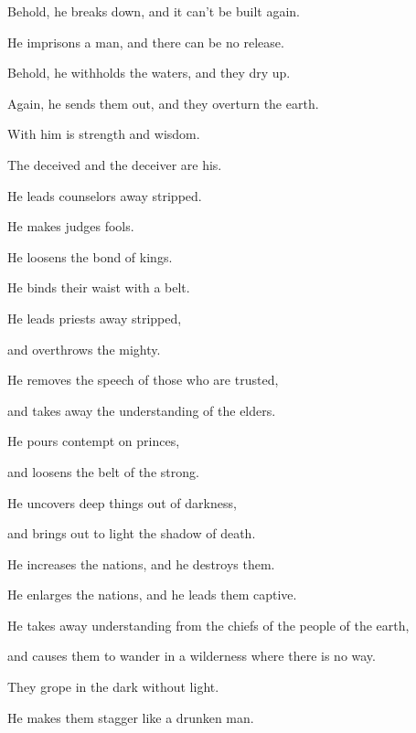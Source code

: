 {\par }{\Q {}Behold, he breaks down, and it can’t be built again.
\par }{\QB He imprisons a man, and there can be no release.
\par }{\Q {}Behold, he withholds the waters, and they dry up.
\par }{\QB Again, he sends them out, and they overturn the earth.
\par }{\Q {}With him is strength and wisdom.
\par }{\QB The deceived and the deceiver are his.
\par }{\Q {}He leads counselors away stripped.
\par }{\QB He makes judges fools.
\par }{\Q {}He loosens the bond of kings.
\par }{\QB He binds their waist with a belt.
\par }{\Q {}He leads priests away stripped,
\par }{\QB and overthrows the mighty.
\par }{\Q {}He removes the speech of those who are trusted,
\par }{\QB and takes away the understanding of the elders.
\par }{\Q {}He pours contempt on princes,
\par }{\QB and loosens the belt of the strong.
\par }{\Q {}He uncovers deep things out of darkness,
\par }{\QB and brings out to light the shadow of death.
\par }{\Q {}He increases the nations, and he destroys them.
\par }{\QB He enlarges the nations, and he leads them captive.
\par }{\Q {}He takes away understanding from the chiefs of the people of the earth,
\par }{\QB and causes them to wander in a wilderness where there is no way.
\par }{\Q {}They grope in the dark without light.
\par }{\QB He makes them stagger like a drunken man.
\par }{\BB \par }
